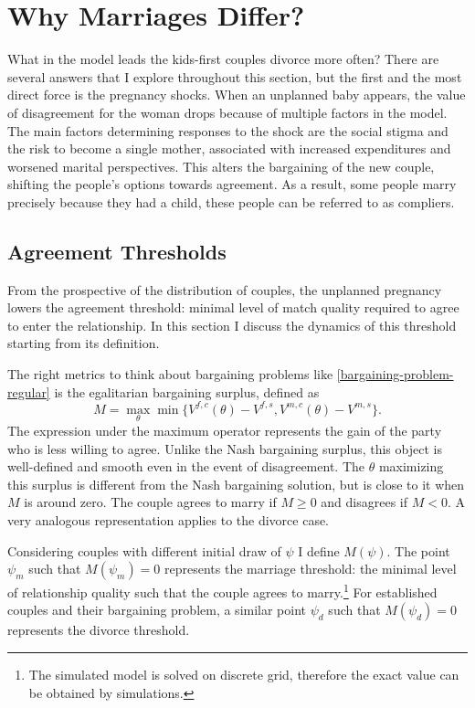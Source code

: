 \documentclass[12pt,letter]{article}
\begin{document}
\section{Why Marriages Differ?}
What in the model leads the kids-first couples divorce more often? There are several answers that I explore throughout this section, but the first and the most direct force is the pregnancy shocks. When an unplanned baby appears, the value of disagreement for the woman drops because of multiple factors in the model. The main factors determining responses to the shock are the social stigma and the risk to become a single mother, associated with increased expenditures and worsened marital perspectives. This alters the bargaining of the new couple, shifting the people's options towards agreement. As a result, some people marry precisely because they had a child, these people can be referred to as compliers.

\subsection{Agreement Thresholds}
From the prospective of the distribution of couples, the unplanned pregnancy lowers the agreement threshold: minimal level of match quality required to agree to enter the relationship. In this section I discuss the dynamics of this threshold starting from its definition.

The right metrics to think about bargaining problems like \ref{bargaining-problem-regular} is the egalitarian bargaining surplus, defined as
\begin{equation}M = \max_{\theta} \min\{V^{f,c}(\theta) - V^{f,s}, V^{m,c}(\theta) - V^{m,s}\}.\end{equation}
The expression under the maximum operator represents the gain of the party who is less willing to agree. Unlike the Nash bargaining surplus, this object is well-defined and smooth even in the event of disagreement. The $\theta$ maximizing this surplus is different from the Nash bargaining solution, but is close to it when $M$ is around zero. The couple agrees to marry if $M\geq 0$ and disagrees if $M<0$. A very analogous representation applies to the divorce case.

Considering couples with different initial draw of $\psi$ I define $M(\psi)$. The point $\psi_m$ such that $M(\psi_m) = 0$ represents the marriage threshold: the minimal level of relationship quality such that the couple agrees to marry.\footnote{The simulated model is solved on discrete grid, therefore the exact value can be obtained by simulations.} For established couples and their bargaining problem, a similar point $\psi_d$ such that $M(\psi_d) = 0$ represents the divorce threshold.
\end{document}
